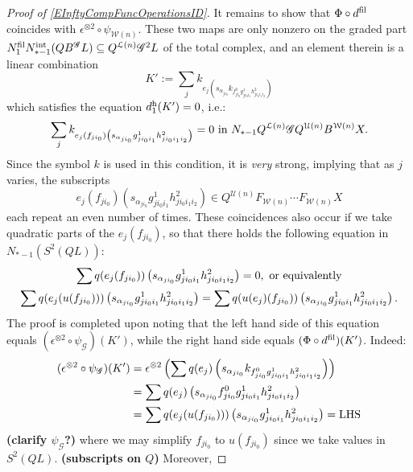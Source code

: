 \documentclass[11pt]{amsart}
\theoremstyle{plain}
\theoremstyle{definition}
\newcommand{\scrG}{\mathscr{G}}
\newcommand{\calW}{\mathcal{W}}
\newcommand{\calU}{\mathcal{U}}
\newcommand{\calL}{\mathcal{L}}
\theoremstyle{plain}
\newcommand{\BSW}{{\scrG}}
\newcommand{\BSWres}{B^\BSW}%
\begin{document}
\begin{Operations in composite functor spectral sequences}
\begin{proof}[Proof of \ref{EInftyCompFuncOperationsID}]
It remains to show that $\Phi\circ d^\textup{fil}$ coincides with $\epsilon^{\otimes 2}\circ\psi_{\calW(n)}$. These two maps are only nonzero on the graded part $N_1^\textup{fil}N_{*-1}^\textup{int}(Q\BSWres L)\subseteq Q^{\calL(n)}\BSW^2 L$ of the total complex, and an element therein is a linear combination
\[K':=\sum_j k_{e_j\left(s_{\alpha_{ji_0}} k_{f^0_{ji_0}g^1_{ji_0i_1}h^2_{ji_0i_1i_2}}\right)}\]
which satisfies the equation $d_1^\textup{h}(K')=0$, i.e.:
\[\sum_j k_{e_j(f_{ji_0})\left(s_{\alpha_{ji_0}} {g^1_{ji_0i_1}h^2_{ji_0i_1i_2}}\right)}=0\textup{ in }N_{*-1}Q^{\calL(n)}\BSW Q^{\calU(n)}B^{\calW(n)}X.\]
Since the symbol $k$ is used in this condition, it is \emph{very} strong, implying that as $j$ varies, the subscripts 
\[e_j(f_{ji_0})\left(s_{\alpha_{ji_0}} {g^1_{ji_0i_1}h^2_{ji_0i_1i_2}}\right)\in Q^{\calU(n)}F_{\calW(n)}\cdots F_{\calW(n)}X\]
each repeat an even number of times. %
These coincidences also occur if we take quadratic parts of the $e_j(f_{ji_0})$, so that there holds the following equation in $N_{*-1}(S^2(QL))$:
\begin{gather*}
\sum q(e_j(f_{ji_0}))\left(s_{\alpha_{ji_0}} {g^1_{ji_0i_1}h^2_{ji_0i_1i_2}}\right)=0,\textup{ or equivalently}\\
\sum q(e_j(u(f_{ji_0})))\left(s_{\alpha_{ji_0}} {g^1_{ji_0i_1}h^2_{ji_0i_1i_2}}\right)
=
\sum q(u(e_j)(f_{ji_0}))\left(s_{\alpha_{ji_0}} {g^1_{ji_0i_1}h^2_{ji_0i_1i_2}}\right).
\end{gather*}
The proof is completed upon noting that the left hand side of this equation equals $(\epsilon^{\otimes 2}\circ \psi_{\BSW})(K')$, while the right hand side equals $(\Phi\circ d^\textup{fil})(K')$. Indeed:
\begin{alignat*}{2}
(\epsilon^{\otimes 2}\circ \psi_{\BSW})(K')
&=
\epsilon^{\otimes 2}\left(\sum q(e_j)\left(s_{\alpha_{ji_0}} k_{f^0_{ji_0}g^1_{ji_0i_1}h^2_{ji_0i_1i_2}}\right)\right)%
\\
&=
\sum q(e_j)\left(s_{\alpha_{ji_0}} f^0_{ji_0}g^1_{ji_0i_1}h^2_{ji_0i_1i_2}\right)%
\\
&=
\sum q(e_j(u(f_{ji_0})))\left(s_{\alpha_{ji_0}} g^1_{ji_0i_1}h^2_{ji_0i_1i_2}\right)=\textup{LHS}
\end{alignat*}
\textbf{(clarify $\psi_{\BSW}$?)} where we may simplify $f_{ji_0}$ to $u(f_{ji_0})$ since we take values in $S^2(QL)$. \textbf{(subscripts on $Q$)} Moreover,

\end{proof}
\end{Operations in composite functor spectral sequences}
\end{document}
